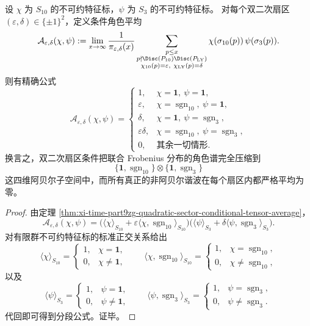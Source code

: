 \begin{theorem}[四扇区条件下的角色谱完全坍缩]\label{thm:xi-time-part9zg-quadratic-sector-character-harmonic-collapse}
设 \(\chi\) 为 \(S_{10}\) 的不可约特征标，\(\psi\) 为 \(S_3\) 的不可约特征标。
对每个双二次扇区 \((\varepsilon,\delta)\in\{\pm1\}^2\)，定义条件角色平均
\[
\mathcal A_{\varepsilon,\delta}(\chi,\psi)
:=
\lim_{x\to\infty}
\frac{1}{\pi_{\varepsilon,\delta}(x)}
\sum_{\substack{p\le x\\ p\nmid \Disc(P_{10})\Disc(P_{\mathrm{LY}})\\
\chi_{10}(p)=\varepsilon,\ \chi_{\mathrm{LY}}(p)=\delta}}
\chi(\sigma_{10}(p))\,\psi(\sigma_3(p)).
\]
则有精确公式
\[
\boxed{\;
\mathcal A_{\varepsilon,\delta}(\chi,\psi)=
\begin{cases}
1,& \chi=\mathbf 1,\ \psi=\mathbf 1,\\[2pt]
\varepsilon,& \chi=\operatorname{sgn}_{10},\ \psi=\mathbf 1,\\[2pt]
\delta,& \chi=\mathbf 1,\ \psi=\operatorname{sgn}_{3},\\[2pt]
\varepsilon\delta,& \chi=\operatorname{sgn}_{10},\ \psi=\operatorname{sgn}_{3},\\[2pt]
0,& \text{其余一切情形}.
\end{cases}\;}
\]
换言之，双二次扇区条件把联合 Frobenius 分布的角色谱完全压缩到
\[
\{\mathbf 1,\operatorname{sgn}_{10}\}\otimes
\{\mathbf 1,\operatorname{sgn}_{3}\}
\]
这四维阿贝尔子空间中，而所有真正的非阿贝尔谐波在每个扇区内都严格平均为零。
\end{theorem}
\begin{proof}
由定理 \ref{thm:xi-time-part9zg-quadratic-sector-conditional-tensor-average}，
\[
\mathcal A_{\varepsilon,\delta}(\chi,\psi)
=
\bigl(\langle \chi\rangle_{S_{10}}+\varepsilon\langle \chi,\operatorname{sgn}_{10}\rangle_{S_{10}}\bigr)
\bigl(\langle \psi\rangle_{S_3}+\delta\langle \psi,\operatorname{sgn}_{3}\rangle_{S_3}\bigr).
\]
对有限群不可约特征标的标准正交关系给出
\[
\langle \chi\rangle_{S_{10}}=
\begin{cases}
1,& \chi=\mathbf 1,\\
0,& \chi\neq \mathbf 1,
\end{cases}
\qquad
\langle \chi,\operatorname{sgn}_{10}\rangle_{S_{10}}=
\begin{cases}
1,& \chi=\operatorname{sgn}_{10},\\
0,& \chi\neq \operatorname{sgn}_{10},
\end{cases}
\]
以及
\[
\langle \psi\rangle_{S_3}=
\begin{cases}
1,& \psi=\mathbf 1,\\
0,& \psi\neq \mathbf 1,
\end{cases}
\qquad
\langle \psi,\operatorname{sgn}_{3}\rangle_{S_3}=
\begin{cases}
1,& \psi=\operatorname{sgn}_{3},\\
0,& \psi\neq \operatorname{sgn}_{3}.
\end{cases}
\]
代回即可得到分段公式。证毕。
\end{proof}
